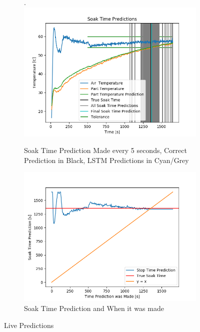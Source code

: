 \begin{figure}[ht]
    \begin{subfigure}{.5\linewidth}.
        \centering
    	\includegraphics[width=0.9\linewidth]{lstm/soak_time_predictions.png}
        \caption{Soak Time Prediction Made every 5 seconds, Correct Prediction in Black, LSTM Predictions in Cyan/Grey}
    \end{subfigure}
    \begin{subfigure}{.5\linewidth}
    	\centering
    	\includegraphics[width=0.9\linewidth]{lstm/soak_time_predictionsb.png}
        \caption{Soak Time Prediction and When it was made}
    \end{subfigure}
    \caption{Live Predictions}
    \label{fig:live_predict_36}
\end{figure}\clearpage
